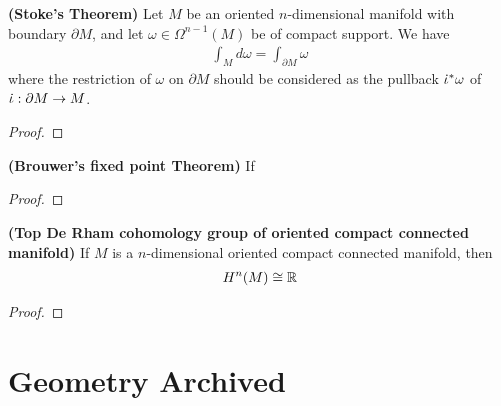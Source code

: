 \documentclass{report}
\begin{document}
\begin{theorem}
\textbf{(Stoke's Theorem)} Let $M$ be an oriented  $n$-dimensional manifold with  boundary $\partial M$, and let $\omega \in \Omega^{n-1}(M)$ be of compact support. We have 
\begin{align*}
\int_M d\omega = \int_{\partial M} \omega 
\end{align*}
where the restriction of $\omega$ on $\partial M$ should be considered as the pullback $\dot{\iota}^*\omega $ of $\dot{\iota}: \partial M\rightarrow M $. 
\end{theorem}
\begin{proof}

\end{proof}
\begin{theorem}
\textbf{(Brouwer's fixed point Theorem)} If 
\end{theorem}
\begin{proof}

\end{proof}
\begin{theorem}
\textbf{(Top De Rham cohomology group of oriented compact connected manifold)} If $M$ is a $n$-dimensional oriented compact connected manifold, then 
 \begin{align*}
H^n(M)\cong  \mathbb{R}
\end{align*}
\end{theorem}
\begin{proof}

\end{proof}
\chapter{Geometry Archived}
\end{document}
